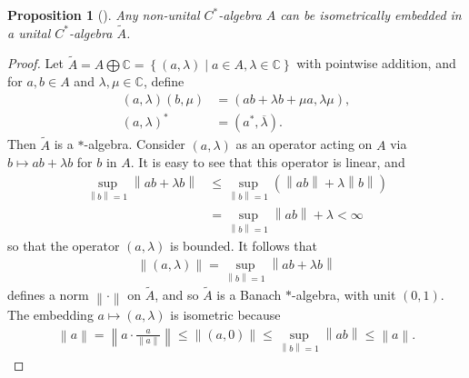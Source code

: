 \documentclass[11pt,a4paper]{report}
\theoremstyle{plain}
\newtheorem*{prop*}{Proposition}
\theoremstyle{definition}
\newcommand{\1}{\mathbbm{1}}
\newcommand{\C}{\mathbb{C}}
\renewcommand{\oplus}{\textstyle\bigoplus}
\begin{document}
\begin{prop*}[{\cite[I.1.3]{davidson96}}]\label{prop:unit}
	Any non-unital $C^\ast$-algebra $A$ can be isometrically embedded in a unital 
	$C^\ast$-algebra $\tilde{A}$.

\end{prop*}
\begin{proof}
	Let $\tilde{A} = A \oplus \C = \left\{(a,\lambda) \mid a\in A, \lambda \in 
	\C\right\}$  with pointwise addition, and for $a, b \in A$ and $\lambda,\mu 
	\in \C$, define
	\begin{align*}
		(a,\lambda) (b,\mu) &= (ab+\lambda b + \mu a, \lambda \mu),								\\
		(a,\lambda)^\ast &= (a^\ast,\overline{\lambda}).
	\end{align*}
	Then $\tilde{A}$ is a $\ast$-algebra. 
	Consider $(a,\lambda)$ as an operator acting on $A$ via $b\mapsto ab+\lambda b$ 
	for $b$ in $A$. It is easy to see that this operator is linear, and 
	\begin{align*}
				\sup_{\left\|b\right\|=1}\left\|ab+\lambda b\right\| 
		&\leq 	\sup_{\left\|b\right\|=1} (\left\|ab\right\|+ \lambda\left\|b\right\|)			\\
		&=		\sup_{\left\|b\right\|=1} \left\|ab\right\|+ \lambda < \infty
	\end{align*}
	so that the operator $(a,\lambda)$ is bounded. It follows that
	\begin{align*}
		\left\|(a,\lambda)\right\| = \sup_{\left\|b\right\|=1}\left\|ab+\lambda b\right\|
	\end{align*}
	defines a norm $\left\|\cdot\right\|$ on $\tilde{A}$, and so $\tilde{A}$ is a 
	Banach $\ast$-algebra, with unit $(0,1)$.
	The embedding $a\mapsto(a,\lambda)$ is isometric because 
	\begin{align*}
		\left\|a\right\| = \left\|a\cdot\frac{a}{\left\|a\right\|}\right\| 
						 \leq \left\|(a,0)\right\| 
						 \leq \sup_{\left\|b\right\|=1}{\left\|ab\right\|} 
						 \leq \left\|a\right\|.
	\end{align*}
	

\end{proof}
\end{document}
